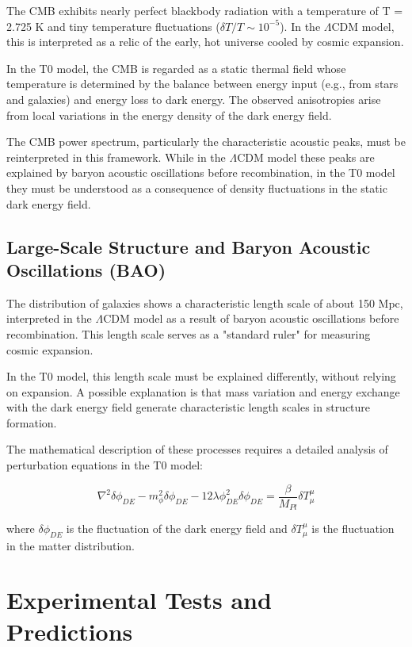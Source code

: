 \documentclass[a4paper,12pt]{article}
\begin{document}
The CMB exhibits nearly perfect blackbody radiation with a temperature of T = 2.725 K and tiny temperature fluctuations ($\delta T/T \sim 10^{-5}$). In the $\Lambda$CDM model, this is interpreted as a relic of the early, hot universe cooled by cosmic expansion.

In the T0 model, the CMB is regarded as a static thermal field whose temperature is determined by the balance between energy input (e.g., from stars and galaxies) and energy loss to dark energy. The observed anisotropies arise from local variations in the energy density of the dark energy field.

The CMB power spectrum, particularly the characteristic acoustic peaks, must be reinterpreted in this framework. While in the $\Lambda$CDM model these peaks are explained by baryon acoustic oscillations before recombination, in the T0 model they must be understood as a consequence of density fluctuations in the static dark energy field.

\subsection{Large-Scale Structure and Baryon Acoustic Oscillations (BAO)}

The distribution of galaxies shows a characteristic length scale of about 150 Mpc, interpreted in the $\Lambda$CDM model as a result of baryon acoustic oscillations before recombination. This length scale serves as a "standard ruler" for measuring cosmic expansion.

In the T0 model, this length scale must be explained differently, without relying on expansion. A possible explanation is that mass variation and energy exchange with the dark energy field generate characteristic length scales in structure formation.

The mathematical description of these processes requires a detailed analysis of perturbation equations in the T0 model:

\begin{equation}
	\nabla^2 \delta\phi_{DE} - m_{\phi}^2 \delta\phi_{DE} - 12\lambda\phi_{DE}^2 \delta\phi_{DE} = \frac{\beta}{M_{Pl}}\delta T^{\mu}_{\mu}
\end{equation}

where $\delta\phi_{DE}$ is the fluctuation of the dark energy field and $\delta T^{\mu}_{\mu}$ is the fluctuation in the matter distribution.

\section{Experimental Tests and Predictions}
\end{document}
